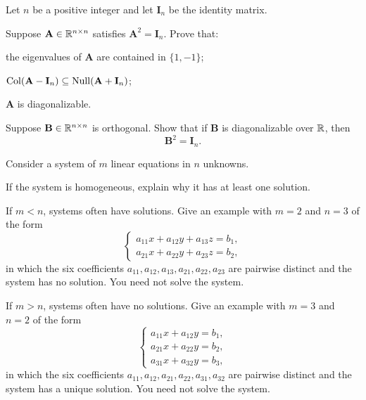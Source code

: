 \begin{problem}
Let $n$ be a positive integer and let $\mathbf I_n$ be the identity matrix.
\begin{problemsubparts}
\item Suppose $\mathbf A\in\mathbb{R}^{n\times n}$ satisfies $\mathbf A^2=\mathbf I_n$. Prove that:
\begin{problemclauses}
\item the eigenvalues of $\mathbf A$ are contained in $\{1,-1\}$;
\item $\operatorname{Col}(\mathbf A-\mathbf I_n)\subseteq\operatorname{Null}(\mathbf A+\mathbf I_n)$;
\item $\mathbf A$ is diagonalizable.
\end{problemclauses}
\item Suppose $\mathbf B\in\mathbb{R}^{n\times n}$ is orthogonal. Show that if $\mathbf B$ is diagonalizable over $\mathbb{R}$, then
\[
\mathbf B^2=\mathbf I_n.
\]
\end{problemsubparts}
\end{problem}

\begin{problem}
Consider a system of $m$ linear equations in $n$ unknowns.
\begin{problemsubparts}
\item If the system is homogeneous, explain why it has at least one solution.
\item If $m<n$, systems often have solutions. Give an example with $m=2$ and $n=3$ of the form
\[
\begin{cases}
a_{11}x+a_{12}y+a_{13}z=b_1,\\
a_{21}x+a_{22}y+a_{23}z=b_2,
\end{cases}
\]
in which the six coefficients $a_{11},a_{12},a_{13},a_{21},a_{22},a_{23}$ are pairwise distinct and the system has no solution. You need not solve the system.
\item If $m>n$, systems often have no solutions. Give an example with $m=3$ and $n=2$ of the form
\[
\begin{cases}
a_{11}x+a_{12}y=b_1,\\
a_{21}x+a_{22}y=b_2,\\
a_{31}x+a_{32}y=b_3,
\end{cases}
\]
in which the six coefficients $a_{11},a_{12},a_{21},a_{22},a_{31},a_{32}$ are pairwise distinct and the system has a unique solution. You need not solve the system.
\end{problemsubparts}
\end{problem}

